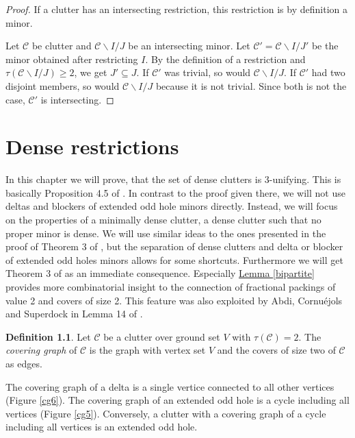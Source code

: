 \documentclass[a4paper, 12pt]{scrbook}
\theoremstyle{definition}
\newtheorem*{definition}{Definition}
\begin{document}
  \begin{proof}
      If a clutter has an intersecting restriction, this restriction is by definition a minor.

      Let $\mathcal{C}$ be clutter and $\mathcal{C} \backslash I /J$ be an intersecting minor.
      Let $\mathcal{C'}=\mathcal{C} \backslash I /J'$ be the minor obtained after restricting $I$.
      By the definition of a restriction and $\tau(\mathcal{C} \backslash I /J) \geq 2$, we get $J' \subseteq J$. If $\mathcal{C'}$ was trivial, so would $\mathcal{C} \backslash I / J$.
      If $\mathcal{C'}$ had two disjoint members, so would $\mathcal{C} \backslash I /J$ because it is not trivial.
      Since both is not the case, $\mathcal{C'}$ is intersecting.
  \end{proof}


   \chapter{Dense restrictions}
   In this chapter we will prove, that the set of dense clutters is 3-unifying.
   This is basically Proposition 4.5 of \cite{restrictions}.
   In contrast to the proof given there, we will not use deltas and blockers of extended odd hole minors directly.
   Instead, we will focus on the properties of a minimally dense clutter, a dense clutter such that no proper minor is dense.
   We will use similar ideas to the ones presented in the proof of Theorem 3 of \cite{deltas}, but the separation of dense clutters and delta or blocker of extended odd holes minors allows for some shortcuts.
   Furthermore we will get Theorem 3 of \cite{deltas} as an immediate consequence.
   Especially \hyperref[bipartite]{Lemma \ref*{bipartite}} provides more combinatorial insight to the connection of fractional packings of value 2 and covers of size 2.
   This feature was also exploited by Abdi, Cornuéjols and Superdock in Lemma 14 of \cite{lemma}.

   \begin{definition}
       Let $\mathcal{C}$ be a clutter over ground set $V$ with $\tau(\mathcal{C})=2$.
       The \emph{covering graph} of $\mathcal{C}$ is the graph with vertex set $V$ and the covers of size two of $\mathcal{C}$ as edges.
   \end{definition}
   The covering graph of a delta is a single vertice connected to all other vertices (Figure \ref*{cg6}).
   The covering graph of an extended odd hole is a cycle including all vertices (Figure \ref*{cg5}). Conversely, a clutter with a covering graph of a cycle including all vertices is an extended odd hole.
\end{document}
